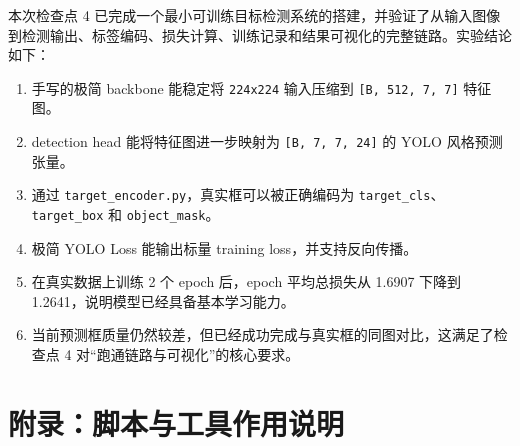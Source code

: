\documentclass[11pt,a4paper]{article}
\begin{document}
本次检查点 4 已完成一个最小可训练目标检测系统的搭建，并验证了从输入图像到检测输出、标签编码、损失计算、训练记录和结果可视化的完整链路。实验结论如下：

\begin{enumerate}
  \item 手写的极简 backbone 能稳定将 \texttt{224x224} 输入压缩到 \texttt{[B, 512, 7, 7]} 特征图。
  \item detection head 能将特征图进一步映射为 \texttt{[B, 7, 7, 24]} 的 YOLO 风格预测张量。
  \item 通过 \texttt{target\_encoder.py}，真实框可以被正确编码为 \texttt{target\_cls}、\texttt{target\_box} 和 \texttt{object\_mask}。
  \item 极简 YOLO Loss 能输出标量 training loss，并支持反向传播。
  \item 在真实数据上训练 2 个 epoch 后，epoch 平均总损失从 1.6907 下降到 1.2641，说明模型已经具备基本学习能力。
  \item 当前预测框质量仍然较差，但已经成功完成与真实框的同图对比，这满足了检查点 4 对“跑通链路与可视化”的核心要求。
\end{enumerate}

\appendix

\section{附录：脚本与工具作用说明}
\end{document}
